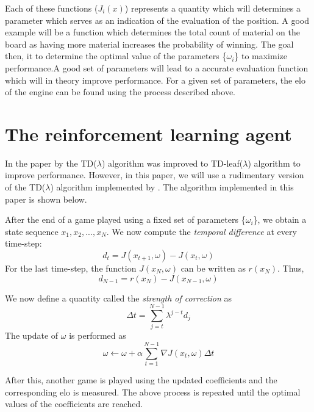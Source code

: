 \documentclass{article}
\begin{document}
Each of these functions ($J_{i}(x)$) represents a quantity which will determines a parameter which serves as an indication of the evaluation of the position. A good example will be a function which determines the total count of material on the board as having more material increases the probability of winning. The goal then, it to determine the optimal value of the parameters \{$\omega_i$\} to maximize performance.A good set of parameters will lead to a accurate evaluation function which will in theory improve performance.  For a given set of parameters, the elo of the engine can be found using the process described above.  

\section{The reinforcement learning agent}
In the paper by \citet{block2008using} the TD($\lambda$) algorithm was improved to TD-leaf($\lambda$) algorithm to improve performance. However, in this paper, we will use a rudimentary version of the TD($\lambda$) algorithm implemented by \citet{baxter1997knightcap, tridgell1997knightcap}. The algorithm implemented in this paper is shown below. 

After the end of a game played using a fixed set of parameters \{$\omega_i$\}, we obtain a state sequence $x_1 , x_2, ..., x_N$. We now compute the \emph{temporal difference} at every time-step:
\[
	d_t = J(x_{t+1}, \omega) -  J(x_{t}, \omega)
\]
For the last time-step, the function $J(x_{N}, \omega)$ can be written as $r(x_N)$. Thus,
\[
    d_{N-1} = r(x_N) -  J(x_{N-1}, \omega)
\]

We now define a quantity called the \emph{strength of correction} as
\[
    \Delta t = \sum_{j = t}^{N-1} \lambda^{j-t}d_j
\]
The update of $\omega$ is performed as 
\begin{equation}
    \omega \leftarrow \omega + \alpha \sum_{t = 1}^{N-1} \nabla J(x_t, \omega) \Delta t
    \label{eq;correction}
\end{equation}

After this, another game is played using the updated coefficients and the corresponding elo is measured. The above process is repeated until the optimal values of the coefficients are reached. 



\end{document}
